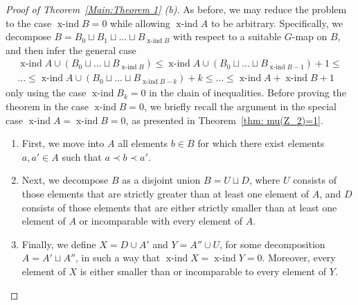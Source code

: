 \documentclass[preprint,12pt]{article}
\renewcommand{\le}{\leqslant}
\theoremstyle{definition}
\theoremstyle{remark}
\numberwithin{equation}{section}
\DeclareMathOperator{\xind}{x-ind}
\begin{document}
\begin{proof}[Proof of Theorem~\ref{Main:Theorem 1} (b)]
As before, we may reduce the problem to the case \(\xind B = 0\) while allowing \(\xind A\) to be arbitrary. Specifically, we decompose \(B = B_0 \sqcup B_1 \sqcup \dots \sqcup B_{\xind B}\) with respect to a suitable \(G\)-map on \(B\), and then infer the general case 
\begin{multline*}
\xind A\cup (B_0\sqcup\dots\sqcup B_{\xind B}) \le \xind A\cup (B_0\sqcup\dots\sqcup B_{\xind B-1}) + 1 \le \\
\dots \le \xind A\cup (B_0\sqcup\dots\sqcup B_{\xind B-k}) + k\le
\dots \le \xind A + \xind B + 1
\end{multline*}
only using the case $\xind B_k=0$ in the chain of inequalities. Before proving the theorem in the case \(\xind B = 0\), we briefly recall the argument in the special case \(\xind A = \xind B = 0\), as presented in Theorem~\ref{thm: mu(Z_2)=1}.
\begin{enumerate}
    \item First, we move into \(A\) all elements \(b \in B\) for which there exist elements \(a, a' \in A\) such that \(a \prec b \prec a'\).
    \item Next, we decompose \(B\) as a disjoint union \(B = U \sqcup D\), where \(U\) consists of those elements that are strictly greater than at least one element of \(A\), and \(D\) consists of those elements that are either strictly smaller than at least one element of \(A\) or incomparable with every element of \(A\).
    \item Finally, we define \(X = D \cup A'\) and \(Y = A'' \cup U\), for some decomposition \(A = A' \sqcup A''\), in such a way that \(\xind X = \xind Y = 0\). Moreover, every element of \(X\) is either smaller than or incomparable to every element of \(Y\).
\end{enumerate}

\end{proof}
\end{document}
